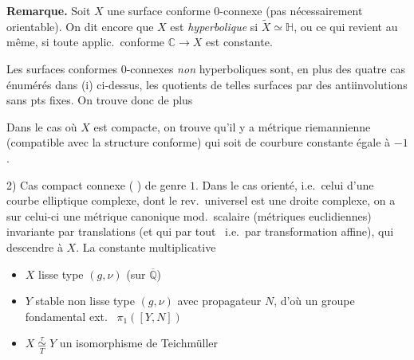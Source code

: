 \documentclass[11pt,a4paper]{article}
\begin{document}
\textbf{Remarque.} Soit $X$ une surface conforme 0-connexe (pas nécessairement orientable). On dit encore que $X$ est \emph{hyperbolique} si $\widetilde{X} \simeq \mathbb{H}$, ou ce qui revient au même, si toute applic.\ conforme $\mathbb{C} \to X$ est constante.

 Les surfaces conformes  0-connexes \emph{non} hyperboliques sont, en plus des quatre cas énumérés dans (i) ci-dessus, les quotients de telles surfaces par des antiinvolutions sans pts fixes. On trouve donc de plus

Dans le cas où $X$ est compacte, on trouve qu'il y a  métrique riemannienne (compatible avec la structure conforme) qui soit de courbure constante égale à $-1$.

2) Cas  compact connexe ( \ill{}) de genre $1$. Dans le cas orienté, i.e.\ celui d'une courbe elliptique complexe, dont le rev.\ universel est une droite complexe, on a sur celui-ci une métrique canonique mod.\ scalaire (métriques euclidiennes) invariante par translations (et qui  par tout \ i.e.\ par transformation affine), qui  descendre à $X$. La constante multiplicative

\begin{itemize}
  \item[] $X$ lisse type $(g,\nu)$  (sur $\overline{\mathbb{Q}}$)
  \item[] $Y$ stable non lisse type $(g,\nu)$ avec propagateur  $N$, d'où un groupe fondamental ext.\  $\pi_1([Y,N])$
  \item[] $X \overset{\tau}{\underset{T}{\simeq}} Y$ un isomorphisme de Teichmüller
\end{itemize}
\end{document}
